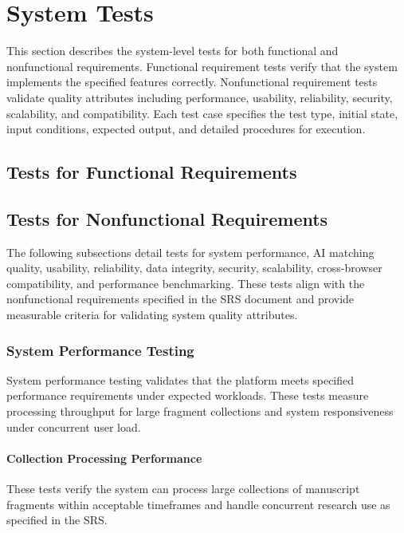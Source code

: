 \documentclass[12pt, titlepage]{article}
\begin{document}
\section{System Tests}

This section describes the system-level tests for both functional and nonfunctional requirements. Functional requirement tests verify that the system implements the specified features correctly. Nonfunctional requirement tests validate quality attributes including performance, usability, reliability, security, scalability, and compatibility. Each test case specifies the test type, initial state, input conditions, expected output, and detailed procedures for execution.

\subsection{Tests for Functional Requirements}


\subsection{Tests for Nonfunctional Requirements}

The following subsections detail tests for system performance, AI matching quality, usability, reliability, data integrity, security, scalability, cross-browser compatibility, and performance benchmarking. These tests align with the nonfunctional requirements specified in the SRS document and provide measurable criteria for validating system quality attributes.

\subsubsection{System Performance Testing}

System performance testing validates that the platform meets specified performance requirements under expected workloads. These tests measure processing throughput for large fragment collections and system responsiveness under concurrent user load.

\paragraph{Collection Processing Performance}

These tests verify the system can process large collections of manuscript fragments within acceptable timeframes and handle concurrent research use as specified in the SRS.
\end{document}
